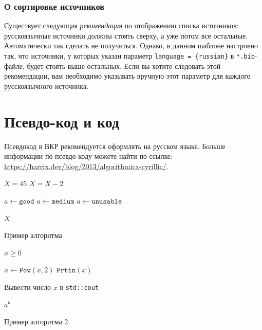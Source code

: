 \documentclass[a4paper, 14pt]{extreport}
\begin{document}
\nocite{duportail:alu}
\nocite{althusser:iia}
\nocite{husserl:pd}
\nocite{husserl:sbe}


\subsubsection{О сортировке источников}

Существует следующая \textit{рекомендация} по отображению списка источников: русскоязычные источники должны стоять сверху, а уже потом все остальные. Автоматически так сделать не получиться. Однако, в данном шаблоне настроено так, что источники, у которых указан параметр \verb!language = {russian}! в \verb!*.bib!-файле, будет стоять выше остальных. Если вы хотите следовать этой рекомендации, вам необходимо указывать вручную этот параметр для каждого русскоязычного источника.




\section{Псевдо-код и код}

Псевдокод в ВКР рекомендуется оформлять на русском языке. Больше информации по псевдо-коду можете найти по ссылке: \url{https://harrix.dev/blog/2013/algorithmicx-cyrillic/}.

\begin{algorithm}
    \begin{algorithmic}[1]
        \State $X=45$
            \State $X=X-2$
            \State {}
            
                    \State $a\gets \mathtt{good}$
                    \State $a\gets \mathtt{medium}$
                \Else
                    \State $a\gets \mathtt{unusable}$
                \EndIf
            \EndWhile
            
            \State \Return $X$
        \EndFor
    \end{algorithmic}
    \caption{Пример алгоритма}
    \label{alg:examples}
\end{algorithm}

\begin{algorithm}
    \begin{algorithmic}[1]
        \Require $x \ge 0$

            \State $x \gets \mathtt{Pow}(x, 2)$
        \EndWhile
        \State $\mathtt{Prtin}(x)$
        
        \Statex
            
            \State Вывести число $x$ в \verb!std::cout!
        \EndProcedure
        
        \Statex
        
            \State \Return $a^b$
        \EndFunction
    \end{algorithmic}
    \caption{Пример алгоритма 2}
    \label{alg:examples2}
\end{algorithm}
\end{document}
